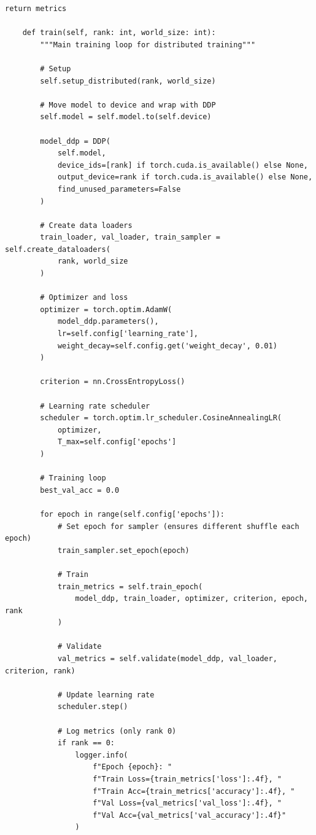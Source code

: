 \begin{lstlisting}[style=python, caption=Complete PyTorch Distributed Training Example]
        return metrics

    def train(self, rank: int, world_size: int):
        """Main training loop for distributed training"""

        # Setup
        self.setup_distributed(rank, world_size)

        # Move model to device and wrap with DDP
        self.model = self.model.to(self.device)

        model_ddp = DDP(
            self.model,
            device_ids=[rank] if torch.cuda.is_available() else None,
            output_device=rank if torch.cuda.is_available() else None,
            find_unused_parameters=False
        )

        # Create data loaders
        train_loader, val_loader, train_sampler = self.create_dataloaders(
            rank, world_size
        )

        # Optimizer and loss
        optimizer = torch.optim.AdamW(
            model_ddp.parameters(),
            lr=self.config['learning_rate'],
            weight_decay=self.config.get('weight_decay', 0.01)
        )

        criterion = nn.CrossEntropyLoss()

        # Learning rate scheduler
        scheduler = torch.optim.lr_scheduler.CosineAnnealingLR(
            optimizer,
            T_max=self.config['epochs']
        )

        # Training loop
        best_val_acc = 0.0

        for epoch in range(self.config['epochs']):
            # Set epoch for sampler (ensures different shuffle each epoch)
            train_sampler.set_epoch(epoch)

            # Train
            train_metrics = self.train_epoch(
                model_ddp, train_loader, optimizer, criterion, epoch, rank
            )

            # Validate
            val_metrics = self.validate(model_ddp, val_loader, criterion, rank)

            # Update learning rate
            scheduler.step()

            # Log metrics (only rank 0)
            if rank == 0:
                logger.info(
                    f"Epoch {epoch}: "
                    f"Train Loss={train_metrics['loss']:.4f}, "
                    f"Train Acc={train_metrics['accuracy']:.4f}, "
                    f"Val Loss={val_metrics['val_loss']:.4f}, "
                    f"Val Acc={val_metrics['val_accuracy']:.4f}"
                )


\end{lstlisting}
